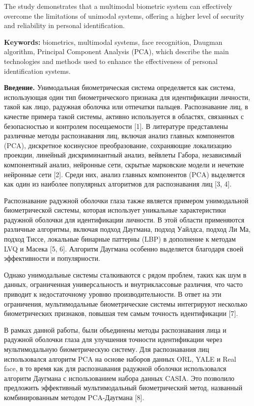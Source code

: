 The study demonstrates that a multimodal biometric system can
effectively overcome the limitations of unimodal systems, offering a
higher level of security and reliability in personal identification.

{\bfseries Keywords:} biometrics, multimodal systems, face recognition,
Daugman algorithm, Principal Component Analysis (PCA), which describe
the main technologies and methods used to enhance the effectiveness of
personal identification systems.

\begin{multicols}{2}
{\bfseries Введение.} Унимодальная биометрическая система определяется как
система, использующая один тип биометрического признака для
идентификации личности, такой как лицо, радужная оболочка или отпечатки
пальцев. Распознавание лиц, в качестве примера такой системы, активно
используется в областях, связанных с безопасностью и контролем
посещаемости {[}1{]}. В литературе представлены различные методы
распознавания лиц, включая анализ главных компонентов (PCA), дискретное
косинусное преобразование, сохраняющие локализацию проекции, линейный
дискриминантный анализ, вейвлеты Габора, независимый компонентный
анализ, нейронные сети, скрытые марковские модели и нечеткие нейронные
сети {[}2{]}. Среди них, анализ главных компонентов (PCA) выделяется как
один из наиболее популярных алгоритмов для распознавания лиц {[}3, 4{]}.

Распознавание радужной оболочки глаза также является примером
унимодальной биометрической системы, которая использует уникальные
характеристики радужной оболочки для идентификации личности. В этой
области применяются различные алгоритмы, включая подход Даугмана, подход
Уайлдса, подход Ли Ма, подход Тиссе, локальные бинарные паттерны (LBP) в
дополнение к методам LVQ и Масека {[}5, 6{]}. Алгоритм Даугмана особенно
выделяется благодаря своей эффективности и популярности.

Однако унимодальные системы сталкиваются с рядом проблем, таких как шум
в данных, ограниченная универсальность и внутриклассовые различия, что
часто приводит к недостаточному уровню производительности. В ответ на
эти ограничения, мультимодальные биометрические системы интегрируют
несколько биометрических признаков, повышая тем самым точность
идентификации {[}7{]}.

В рамках данной работы, были объединены методы распознавания лица и
радужной оболочки глаза для улучшения точности идентификации через
мультимодальную биометрическую систему. Для распознавания лиц
использовался алгоритм PCA на основе наборов данных ORL, YALE и Real
face, в то время как для распознавания радужной оболочки использовался
алгоритм Даугмана с использованием набора данных CASIA. Это позволило
предложить эффективный мультимодальный биометрический метод, названный
комбинированным методом PCA-Даугмана {[}8{]}.


\end{multicols}
